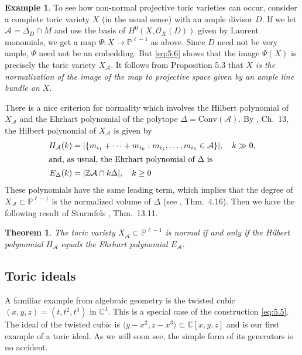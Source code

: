 \documentclass{amsart}
\theoremstyle{plain}
\newtheorem{theorem}{Theorem}[section]
\theoremstyle{definition}
\newtheorem*{example}{Example}
\begin{document}
\begin{example} To see how non-normal projective toric varieties can
occur, consider a complete toric variety $X$ (in 
the usual sense) with an ample divisor $D$.  If we let $\mathcal{A} =
\Delta_D\cap M$ and use the basis of $H^0(X,\mathcal{O}_X(D))$ given by
Laurent monomials, we get a map $\Psi : X \to \mathbb{P}^{\ell - 1}$ as
above.  Since $D$ need not be very ample, $\Psi$ need not be an
embedding.  But \eqref{eq:5.6} shows that the image $\Psi(X)$ is
precisely the toric variety $X_{\mathcal{A}}$.  It follows from
Proposition 5.3 that {\it $X$ is the normalization of the image of the
map to projective space given by an ample line bundle on $X$.}
\end{example}

	There is a nice criterion for normality which involves the
Hilbert polynomial of $X_{\mathcal{A}}$ and the Ehrhart polynomial of the
polytope $\Delta = \mathrm{Conv}(\mathcal{A})$.  By \cite{Stu2}, Ch.~13, the Hilbert polynomial of $X_{\mathcal{A}}$ is given by
\begin{align*}
H_{\mathcal{A}}(k) &= |\{m_{i_1} + \cdots + m_{i_k} :
m_{i_1},\dots,m_{i_k} \in \mathcal{A}\}|,\quad k \gg 0,\\
\intertext{and, as usual, the Ehrhart polynomial of $\Delta$ is}
E_\Delta(k) &= |\mathbb{Z}\mathcal{A}\cap k\Delta|,\quad k \ge 0
\end{align*}
These polynomials have the same leading term, which implies that the
degree of $X_{\mathcal{A}} \subset \mathbb{P}^{\ell-1}$ is the normalized
volume of $\Delta$ (see \cite{Stu2}, Thm.~4.16).  Then we have
the following result of Sturmfels \cite{Stu2}, Thm.~13.11.

\begin{theorem} The toric variety $X_{\mathcal{A}} \subset \mathbb{P}^{\ell-1}$ is normal if and only if the Hilbert polynomial
$H_{\mathcal{A}}$ equals the Ehrhart polynomial $E_{\mathcal{A}}$.
\end{theorem} 

	\subsection{Toric ideals} A familiar example from
algebraic geometry is the twisted cubic $(x,y,z) = (t,t^2,t^3)$ in
$\mathbb{C}^3$.  This is a special case of the construction
\eqref{eq:5.5}.  The ideal of the twisted cubic is $\langle
y-x^2,z-x^3\rangle \subset \mathbb{C}[x,y,z]$ and is our first
example of a toric ideal.  As we will soon see, the simple form of its
generators is no accident.
\end{document}
